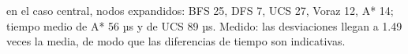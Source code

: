 {en el caso central, nodos expandidos: BFS 25, DFS 7, UCS 27, Voraz 12, A* 14; tiempo medio de A* 56 µs y de UCS 89 µs.}
{Medido: las desviaciones llegan a 1.49 veces la media, de modo que las diferencias de tiempo son indicativas.}
